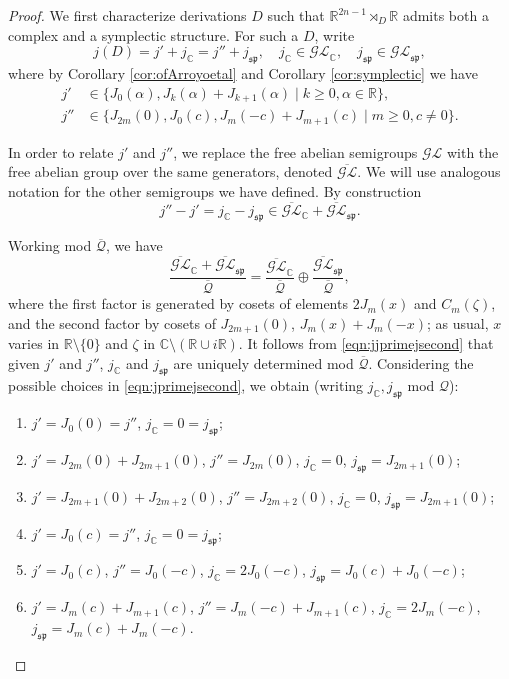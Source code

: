 \documentclass{article}
\theoremstyle{definition}
\newcommand{\R}{\mathbb{R}}
\newcommand{\C}{\mathbb{C}}
\newcommand{\lie}[1]{\mathfrak{#1}}
\newcommand{\GGL}{{\overline{\mathcal{GL}}}}
\begin{document}
\begin{proof}
    We first characterize derivations $D$ such that $\R^{2n-1}\rtimes_D\R$ admits both a complex and a symplectic structure. For such a $D$, write $$j(D)=j'+j_\C=j''+j_{\lie{sp}},\quad j_\C\in\mathcal{GL}_\C,\quad j_{\lie{sp}}\in \mathcal{GL}_{\lie{sp}},$$ where by Corollary \ref{cor:ofArroyoetal} and Corollary \ref{cor:symplectic} we have \begin{equation}\label{eqn:jprimejsecond}
        \begin{aligned}
            j'&\in\{J_0(\alpha), J_k(\alpha) + J_{k+1}(\alpha)\mid k\geq0,\alpha\in\R\},\\
            j''&\in\{J_{2m}(0), J_0(c), J_m(-c)+J_{m+1}(c)\mid m\geq0,c\neq0\}.
        \end{aligned}
    \end{equation}
    
    In order to relate $j'$ and $j''$, we replace the free abelian semigroups $\mathcal{GL}$ with the free abelian group over the same generators, denoted $\GGL$. We will use analogous notation for the other semigroups we have defined. By construction $$j''-j'=j_\C-j_{\lie{sp}}\in\GGL_\C+\GGL_{\lie{sp}}.$$
    
    Working mod $\overline{\mathcal{Q}}$, we have \begin{equation}\label{eqn:jjprimejsecond}
        \frac{\GGL_\C+\GGL_{\lie{sp}}}{\overline{\mathcal{Q}}}=\frac{\GGL_\C}{\overline{\mathcal{Q}}}\oplus \frac{\GGL_{\lie{sp}}}{\overline{\mathcal{Q}}},
    \end{equation} where the first factor is generated by cosets of elements $2J_m(x)$ and $C_m(\zeta)$, and the second factor by cosets of $J_{2m+1}(0)$, $J_m(x)+J_m(-x)$; as usual, $x$ varies in $\R\setminus\{0\}$ and $\zeta$ in $\C\setminus(\R\cup i\R)$. It follows from \eqref{eqn:jjprimejsecond} that given $j'$ and $j''$, $j_\C$ and $j_{\lie {sp}}$ are uniquely determined mod $\overline{\mathcal{Q}}$. Considering the possible choices in \eqref{eqn:jprimejsecond}, we obtain (writing $j_\C,j_{\lie{sp}}$ mod $\mathcal{Q}$): \begin{enumerate}
        \item $j'=J_0(0)=j''$, $j_\C=0=j_{\lie{sp}}$;
        \item $j'=J_{2m}(0)+J_{2m+1}(0)$, $j''=J_{2m}(0)$, $j_\C=0$, $j_{\lie{sp}}= J_{2m+1}(0)$;
        \item $j'=J_{2m+1}(0)+J_{2m+2}(0)$, $j''=J_{2m+2}(0)$, $j_\C=0$, $j_{\lie{sp}}= J_{2m+1}(0)$;
        \item $j'=J_0(c)=j''$, $j_\C=0=j_{\lie{sp}}$;
        \item $j'=J_0(c)$, $j''=J_0(-c)$, $j_\C=2J_0(-c)$, $j_{\lie{sp}}=J_0(c)+J_0(-c)$;
        \item $j'=J_m(c)+J_{m+1}(c)$, $j''=J_m(-c)+J_{m+1}(c)$, $j_\C=2J_m(-c)$, $j_{\lie{sp}}=J_m(c)+J_m(-c)$.
    \end{enumerate}
    

\end{proof}
\end{document}
